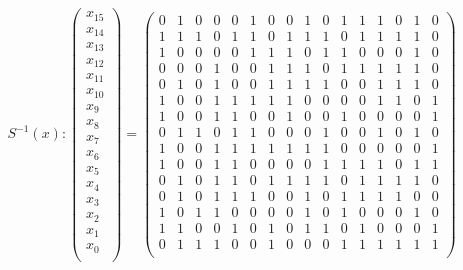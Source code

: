 \begin{align*}
S^{-1}(x) : 
\begin{pmatrix}
x_{15} \\
x_{14} \\
x_{13} \\
x_{12} \\
x_{11} \\
x_{10} \\
x_{9} \\
x_{8} \\
x_{7} \\
x_{6} \\
x_{5} \\
x_{4} \\
x_{3} \\
x_{2} \\
x_{1} \\
x_{0} \\
\end{pmatrix}
=
\begin{pmatrix}
0 & 1 & 0 & 0 & 0 & 1 & 0 & 0 & 1 & 0 & 1 & 1 & 1 & 0 & 1 & 0 \\ 
1 & 1 & 1 & 0 & 1 & 1 & 0 & 1 & 1 & 1 & 0 & 1 & 1 & 1 & 1 & 0 \\ 
1 & 0 & 0 & 0 & 0 & 1 & 1 & 1 & 0 & 1 & 1 & 0 & 0 & 0 & 1 & 0 \\ 
0 & 0 & 0 & 1 & 0 & 0 & 1 & 1 & 1 & 0 & 1 & 1 & 1 & 1 & 1 & 0 \\ 
0 & 1 & 0 & 1 & 0 & 0 & 1 & 1 & 1 & 1 & 0 & 0 & 1 & 1 & 1 & 0 \\ 
1 & 0 & 0 & 1 & 1 & 1 & 1 & 1 & 0 & 0 & 0 & 0 & 1 & 1 & 0 & 1 \\ 
1 & 0 & 0 & 1 & 1 & 0 & 0 & 1 & 0 & 0 & 1 & 0 & 0 & 0 & 0 & 1 \\ 
0 & 1 & 1 & 0 & 1 & 1 & 0 & 0 & 0 & 1 & 0 & 0 & 1 & 0 & 1 & 0 \\ 
1 & 0 & 0 & 1 & 1 & 1 & 1 & 1 & 1 & 1 & 0 & 0 & 0 & 0 & 0 & 1 \\ 
1 & 0 & 0 & 1 & 1 & 0 & 0 & 0 & 0 & 1 & 1 & 1 & 1 & 0 & 1 & 1 \\ 
0 & 1 & 0 & 1 & 1 & 0 & 1 & 1 & 1 & 1 & 0 & 1 & 1 & 1 & 1 & 0 \\ 
0 & 1 & 0 & 1 & 1 & 1 & 0 & 0 & 1 & 0 & 1 & 1 & 1 & 1 & 0 & 0 \\ 
1 & 0 & 1 & 1 & 0 & 0 & 0 & 0 & 1 & 0 & 1 & 0 & 0 & 0 & 1 & 0 \\ 
1 & 1 & 0 & 0 & 1 & 0 & 1 & 0 & 1 & 1 & 0 & 1 & 0 & 0 & 0 & 1 \\ 
0 & 1 & 1 & 1 & 0 & 0 & 1 & 0 & 0 & 0 & 1 & 1 & 1 & 1 & 1 & 1 \\ 

\end{pmatrix}
\end{align*}

